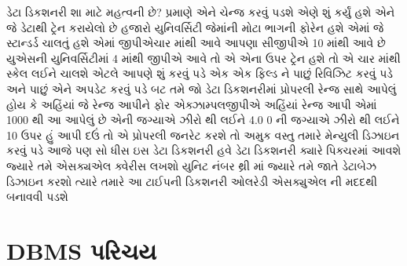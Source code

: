 \documentclass[aspectratio=169, 10pt]{beamer}
\begin{document}
\begin{frame}{ડેટા ડિકશનરી શા માટે મહત્વની છે?}
{પ્રમાણે એને ચેન્જ કરવું પડશે એણે શું કર્યું હશે એને જે ડેટાથી ટ્રેન કરાયેલો છે હજારો યુનિવર્સિટી જેમાંની મોટા ભાગની ફોરેન હશે એમાં જે સ્ટાન્ડર્ડ ચાલતું હશે એમાં જીપીએચાર માંથી આવે આપણા સીજીપીએ 10 માંથી આવે છે યુએસની યુનિવર્સિટીમાં 4 માંથી જીપીએ આવે તો એ એના ઉપર ટ્રેન હશે તો એ ચાર માંથી સ્કેલ લઈને ચાલશે એટલે આપણે શું કરવું પડે એક એક ફિલ્ડ ને પાછું રિવિઝિટ કરવું પડે અને પાછું એને અપડેટ કરવું પડે બટ તમે જો ડેટા ડિકશનરીમાં પ્રોપરલી રેન્જ સાથે આપેલું હોય કે અહિંયાં જે રેન્જ આપીને ફોર એક્ઝામ્પલજીપીએ અહિંયાં રેન્જ આપી એમાં 1000 થી આ આપેલું છે એની જગ્યાએ ઝીરો થી લઈને 4.0 0 ની જગ્યાએ ઝીરો થી લઈને 10 ઉપર હું આપી દઉં તો એ પ્રોપરલી જનરેટ કરશે તો અમુક વસ્તુ તમારે મેન્યુલી ડિઝાઇન કરવું પડે આજે પણ સો ધીસ ઇસ ડેટા ડિકશનરી હવે ડેટા ડિકશનરી ક્યારે પિક્ચરમાં આવશે જ્યારે તમે એસક્યએલ ક્વેરીસ લખશો યુનિટ નંબર થ્રી માં જ્યારે તમે જાતે ડેટાબેઝ ડિઝાઇન કરશો ત્યારે તમારે આ ટાઈપની ડિકશનરી ઓલરેડી એસક્યુએલ ની મદદથી બનાવવી પડશે
}
\end{frame}

\section{DBMS પરિચય}
\end{document}
